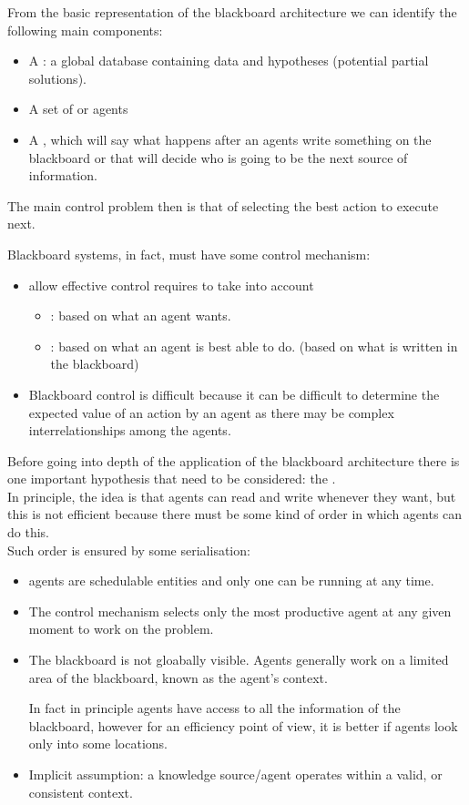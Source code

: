 From the basic representation of the blackboard architecture we can identify the following main components:
\begin{itemize}
\item A : a global database containing data and hypotheses (potential partial solutions). 
\item A set of  or agents
\item A , which will say what happens after an agents write something on the blackboard or that will decide who is going to be the next source of information.
\end{itemize}

The main control problem then is that of selecting the best action to execute next.

Blackboard systems, in fact, must have some control mechanism:
\begin{itemize}
\item allow effective control requires to take into account
\begin{itemize}
\item {}: based on what an agent wants.
\item {}: based on what an agent is best able to do. (based on what is written in the blackboard)
\end{itemize}
\item Blackboard control is difficult because it can be difficult to determine the expected value of an action by an agent as there may be complex interrelationships among the agents.
\end{itemize}

Before going into depth of the application of the blackboard architecture there is one important hypothesis that need to be considered: the .\\
In principle, the idea is that agents can read and write whenever they want, but this is not efficient because there must be some kind of order in which agents can do this. \\
Such order is ensured by some serialisation:
\begin{itemize}
\item agents are schedulable entities and only one can be running at any time.
\item The control mechanism selects only the most productive agent at any given moment to work on the problem.
\item The blackboard is not gloabally visible. Agents generally work on a limited area of the blackboard, known as the agent's context.

In fact in principle agents have access to all the information of the blackboard, however for an efficiency point of view, it is better if agents look only into some locations.
\item Implicit assumption: a knowledge source/agent operates within a valid, or consistent context.
\end{itemize}

